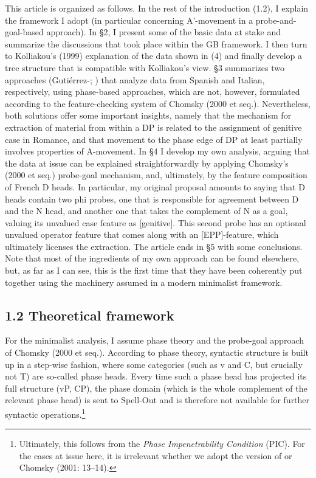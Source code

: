 \documentclass[output=paper]{langsci/langscibook}
\begin{document}
  This article is organized as follows. In the rest of the introduction (1.2), I explain the framework I adopt (in particular concerning A’-movement in a probe-and-goal-based approach). In §2, I present some of the basic data at stake and summarize the discussions that took place within the GB framework. I then turn to Kolliakou’s (1999) explanation of the data shown in (4) and finally develop a tree structure that is compatible with Kolliakou’s view. §3 summarizes two approaches (Gutiérrez-\citealt{Bravo2001}; \citealt{Cinque2014}) that analyze data from Spanish and Italian, respectively, using phase-based approaches, which are not, however, formulated according to the feature-checking system of Chomsky (2000 et seq.). Nevertheless, both solutions offer some important insights, namely that the mechanism for extraction of material from within a DP is related to the assignment of genitive case in Romance, and that movement to the phase edge of DP at least partially involves properties of A-movement. In §4 I develop my own analysis, arguing that the data at issue can be explained straightforwardly by applying Chomsky’s (2000 et seq.) probe-goal mechanism, and, ultimately, by the feature composition of French D heads. In particular, my original proposal amounts to saying that D heads contain two phi probes, one that is responsible for agreement between D and the N head, and another one that takes the complement of N as a goal, valuing its unvalued case feature as [genitive]. This second probe has an optional unvalued operator feature that comes along with an [EPP]-feature, which ultimately licenses the extraction. The article ends in §5 with some conclusions. Note that most of the ingredients of my own approach can be found elsewhere, but, as far as I can see, this is the first time that they have been coherently put together using the machinery assumed in a modern minimalist framework.

\subsection{ 1.2 Theoretical framework}

For the minimalist analysis, I assume phase theory and the probe-goal approach of Chomsky (2000 et seq.). According to phase theory, syntactic structure is built up in a step-wise fashion, where some categories (such as v and C, but crucially not T) are so-called phase heads. Every time such a phase head has projected its full structure (vP, CP), the phase domain (which is the whole complement of the relevant phase head) is sent to Spell-Out and is therefore not available for further syntactic operations.\footnote{Ultimately, this follows from the \textit{Phase Impenetrability Condition} (PIC). For the cases at issue here, it is irrelevant whether we adopt the version of \citet[108]{Chomsky2000} or Chomsky (2001: 13–14).}
\end{document}
